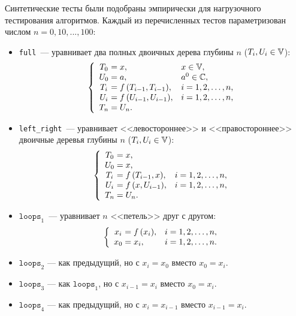 Синтетические тесты были подобраны эмпирически для нагрузочного тестирования алгоритмов. Каждый из перечисленных тестов параметризован числом $n = 0, 10, ..., 100$:
\begin{itemize}
    \item \texttt{full}~--- уравнивает два полных двоичных дерева глубины $n$ ($T_i, U_i \in \mathbb{V}$):
    \begin{equation*}
        \left\{
        \begin{array}{c@{{}={}}ll}
            T_0 & x, & x \in \V, \\
            U_0 & a, & a^0 \in \C, \\
            T_i & f\,(T_{i-1}, T_{i-1}), & i = 1, 2, \dots, n, \\
            U_i & f\,(U_{i-1}, U_{i-1}), & i = 1, 2, \dots, n, \\
            T_n & U_n. \\
        \end{array}
        \right.
    \end{equation*}
    \item \texttt{left\_right}~--- уравнивает <<левостороннее>> и <<правостороннее>> двоичные деревья глубины $n$ ($T_i, U_i \in \mathbb{V}$):
    \begin{equation*}
        \left\{
        \begin{array}{c@{{}={}}ll}
            T_0 & x, \\
            U_0 & x, \\
            T_i & f\,(T_{i-1}, x), & i = 1, 2, \dots, n, \\
            U_i & f\,(x, U_{i-1}), & i = 1, 2, \dots, n, \\
            T_n & U_n. \\
        \end{array}
        \right.
    \end{equation*}
    \item $\texttt{loops}_1$~--- уравнивает $n$ <<петель>> друг с другом:
    \begin{equation*}
        \left\{
        \begin{array}{c@{{}={}}ll}
            x_i & f\,(x_i), & i = 1, 2, \dots, n, \\
            x_0 & x_i, & i = 1, 2, \dots, n. \\
        \end{array}
        \right.
    \end{equation*}
    \item $\texttt{loops}_2$ --- как предыдущий, но с $x_i = x_0$ вместо $x_0 = x_i$.
    \item $\texttt{loops}_3$ --- как $\texttt{loops}_1$, но с $x_{i-1} = x_i$ вместо $x_0 = x_i$.
    \item $\texttt{loops}_4$ --- как предыдущий, но с $x_i = x_{i-1}$ вместо $x_{i-1} = x_i$.
\end{itemize}

